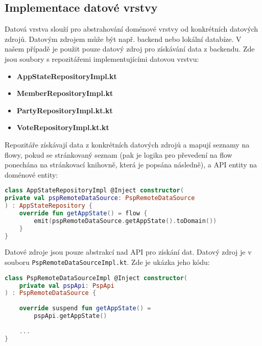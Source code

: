 \subsection {Implementace datové vrstvy}
Datová vrstva slouží pro abstrahování doménové vrstvy od konkrétních datových zdrojů. Datovým zdrojem může být např. backend nebo lokální databíze. V našem případě je použit pouze datový zdroj pro získávání data z backendu. Zde jsou soubory s repozitářemi implementujícími datovou vrstvu:

\begin{itemize}
	\item \textbf{AppStateRepositoryImpl.kt}
	\item \textbf{MemberRepositoryImpl.kt}
	\item \textbf{PartyRepositoryImpl.kt.kt}
	\item \textbf{VoteRepositoryImpl.kt.kt}
\end{itemize}

\noindent Repozitáře získávají data z konkrétních datových zdrojů a mapují seznamy na flowy, pokud se stránkovaný seznam (pak je logika pro převedení na flow ponechána na stránkovací \linebreak knihovně, která je popsána následně), a API entity na doménové entity:

\begin{lstlisting}[caption={Ukázka datové vrstvy pro data o stavu aplikace}, label={lst:use-case-repository}, tabsize=2, language=Kotlin]
class AppStateRepositoryImpl @Inject constructor(
private val pspRemoteDataSource: PspRemoteDataSource
) : AppStateRepository {
	override fun getAppState() = flow { 			
		emit(pspRemoteDataSource.getAppState().toDomain()) 
	}
}
\end{lstlisting}

\noindent Datové zdroje jsou pouze abstrakcí nad API pro získání dat. Datový zdroj je v souboru \linebreak \lstinline|PspRemoteDataSourceImpl.kt|. Zde je ukázka jeho kódu:

\newpage

\begin{lstlisting}[caption={Ukázka datového zdroje}, label={lst:data-source}, tabsize=2, language=Kotlin]
class PspRemoteDataSourceImpl @Inject constructor(
	private val pspApi: PspApi
) : PspRemoteDataSource {
	
	override suspend fun getAppState() = 
		pspApi.getAppState()
		
	...
}
\end{lstlisting}

